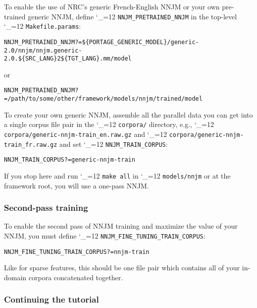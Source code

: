 \documentclass[11pt,letterpaper]{article}
\def\code{\begingroup\catcode`\_=12 \codex}
\newcommand{\codex}[1]{\texttt{#1}\endgroup}
\begin{document}
To enable the use of NRC's generic French-English NNJM or your own pre-trained
generic NNJM, define \code{NNJM_PRETRAINED_NNJM} in the top-level
\code{Makefile.params}:
\begin{small}
\begin{alltt}
   NNJM_PRETRAINED_NNJM ?= \$\{PORTAGE_GENERIC_MODEL\}/generic-2.0/nnjm/nnjm.generic-
2.0.\$\{SRC_LANG\}2\$\{TGT_LANG\}.mm/model
\end{alltt}
\end{small}
or
\begin{small}
\begin{alltt}
   NNJM_PRETRAINED_NNJM ?= /path/to/some/other/framework/models/nnjm/trained/model
\end{alltt}
\end{small}

To create your own generic NNJM, assemble all the parallel data you can get
into a single corpus file pair in the \code{corpora/} directory, e.g.,
\code{corpora/generic-nnjm-train_en.raw.gz} and
\code{corpora/generic-nnjm-train_fr.raw.gz} and set \code{NNJM_TRAIN_CORPUS}:
\begin{small}
\begin{alltt}
   NNJM_TRAIN_CORPUS ?= generic-nnjm-train
\end{alltt}
\end{small}

If you stop here and run \code{make all} in \code{models/nnjm} or at the
framework root, you will use a one-pass NNJM.

\subsubsection{Second-pass training}

To enable the second pass of NNJM training and maximize the value of your NNJM,
you must define \code{NNJM_FINE_TUNING_TRAIN_CORPUS}:
\begin{small}
\begin{alltt}
   NNJM_FINE_TUNING_TRAIN_CORPUS ?= nnjm-train
\end{alltt}
\end{small}
Like for sparse features, this should be one file pair which contains all of
your in-domain corpora concatenated together.

\subsubsection{Continuing the tutorial}
\end{document}
